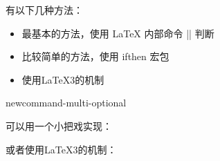




有以下几种方法：
\begin{itemize}
\item 最基本的方法，使用 \LaTeX{} 内部命令 |\@ifstar| 判断
\begin{texlist}
    \makeatletter
    \newcommand{\mycommand}{%
      \@ifstar
        \mycommandStar%
        \mycommandNoStar%
    }
    \makeatother
    \newcommand{\mycommandStar}{starred version}
    \newcommand{\mycommandNoStar}{normal version}
\end{texlist}
\item 比较简单的方法，使用 ifthen 宏包
\begin{texlist}
    \usepackage{ifthen}
    \newcommand{\mycommand}[1]{\ifthenelse{\equal{#1}{*}}%
      {\mycommandStar}%
      {\mycommandNoStar{#1}}%
    }
    \newcommand{\mycommandStar}{starred version}
    \newcommand{\mycommandNoStar}[1]{normal version}  
\end{texlist}
\item 使用\LaTeX{3}的机制
\begin{texlist}
    \usepackage{xparse}
    \NewDocumentCommand{}
\end{texlist}
\end{itemize}




{newcommand-multi-optional}

可以用一个小把戏实现：
\begin{texlist}
  \newcommand{\mycmd}[1][option1]{%
    \def\ArgI{{#1}}%
    \mycmdoptii
  }
  \newcommand\mycmdoptii[1][option2]{%
    ...
  }
\end{texlist}

或者使用\LaTeX{3}的机制：
\begin{texlist}
  \usepackage{xparse}
  \NewDocumentCommand{}
\end{texlist}



